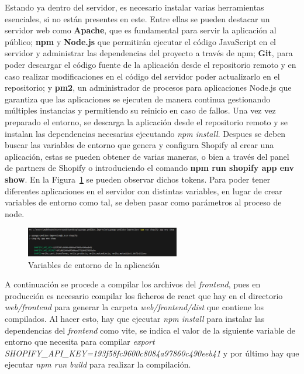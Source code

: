 \documentclass[11pt]{article}
\begin{document}
Estando ya dentro del servidor, es necesario instalar varias herramientas esenciales, si no están presentes en este. Entre ellas se pueden destacar un servidor web como \textbf{Apache}, que es fundamental para servir la aplicación
al público; \textbf{npm} y \textbf{Node.js} que permitirán ejecutar el código JavaScript en el servidor y administrar las dependencias del proyecto a través de npm; \textbf{Git}, para poder descargar el código fuente de la aplicación desde 
el repositorio remoto y en caso realizar modificaciones en el código del servidor poder actualizarlo en el repositorio; y \textbf{pm2}, un administrador de 
procesos para aplicaciones Node.js que garantiza que las aplicaciones se ejecuten de manera continua gestionando múltiples instancias y permitiendo su reinicio en caso de fallos.
Una vez vez preparado el entorno, se descarga la aplicación desde el repositorio remoto y se instalan las dependencias necesarias ejecutando \textit{npm install}. Despues se deben buscar las variables de entorno que genera y configura Shopify al crear una aplicación,
estas se pueden obtener de varias maneras, o bien a través del panel de partners de Shopify o introduciendo el comando \textbf{npm run shopify app env show}. En la Figura~\ref{fig:VariablesEntorno} se pueden observar dichos tokens. Para poder 
tener diferentes aplicaciones en el servidor con distintas variables, en lugar de crear variables de entorno como tal, se deben pasar como parámetros al proceso de node.

\begin{figure}[H]
    \centering
    \includegraphics[width=0.6\textwidth]{imagenes/variablesEntornoDespliegue.png}
    \caption{\label{fig:VariablesEntorno}Variables de entorno de la aplicación}
    \vspace{\fill}
\end{figure}

A continuación se procede a compilar los archivos del \textit{frontend}, pues en producción es necesario compilar los ficheros de react que hay en el directorio \textit{web/frontend} 
para generar la carpeta \textit{web/frontend/dist} que contiene los compilados. Al hacer esto, hay que ejecutar \textit{npm install} para instalar las dependencias del \textit{frontend} como vite,
se indica el valor de la siguiente variable de entorno que necesita para compilar \textit{export SHOPIFY\_API\_KEY=193f58fc9600c8084a97860c490eeb41} y por último hay que ejecutar \textit{npm run build} para realizar
la compilación.
\end{document}
